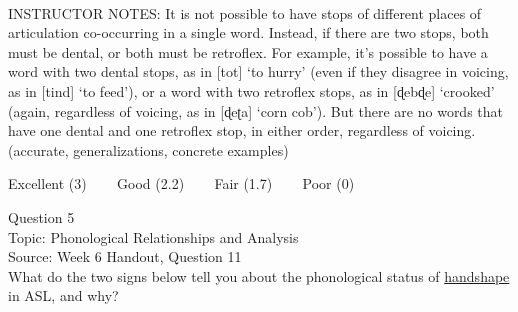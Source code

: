 \documentclass[12pt]{article}
\begin{document}
~\\
INSTRUCTOR NOTES: It is not possible to have stops of different places of articulation co-occurring in a single word. Instead, if there are two stops, both must be dental, or both must be retroflex. For example, it’s possible to have a word with two dental stops, as in [tot] ‘to hurry’ (even if they disagree in voicing, as in [tind] ‘to feed’), or a word with two retroflex stops, as in [ɖebɖe] ‘crooked’ (again, regardless of voicing, as in [ɖeʈa] ‘corn cob’). But there are no words that have one dental and one retroflex stop, in either order, regardless of voicing. (accurate, generalizations, concrete examples)


\vfill
Excellent (3) ~~~ Good (2.2) ~~~ Fair (1.7) ~~~ Poor (0)
\newpage

{\large Question 5}\\

Topic: Phonological Relationships and Analysis\\
Source: Week 6 Handout, Question 11\\

What do the two signs below tell you about the phonological status of \underline{handshape} in ASL, and why?\\
\end{document}
